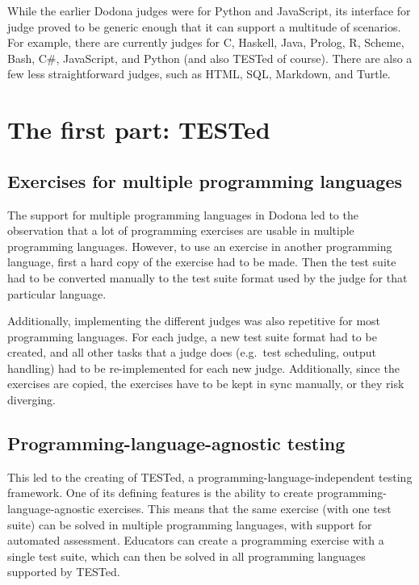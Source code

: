 \documentclass[./main]{subfiles}
\begin{document}
While the earlier Dodona judges were for Python and JavaScript, its interface for judge proved to be generic enough that it can support a multitude of scenarios.
For example, there are currently judges for C, Haskell, Java, Prolog, R, Scheme, Bash, C\#, JavaScript, and Python (and also TESTed of course).
There are also a few less straightforward judges, such as HTML, SQL, Markdown, and Turtle.

\section{The first part: TESTed}\label{sec:intro-tested}

\subsection{Exercises for multiple programming languages}\label{subsec:exercises-for-multiple-programming-languages}

The support for multiple programming languages in Dodona led to the observation that a lot of programming exercises are usable in multiple programming languages.
However, to use an exercise in another programming language, first a hard copy of the exercise had to be made.
Then the test suite had to be converted manually to the test suite format used by the judge for that particular language.

Additionally, implementing the different judges was also repetitive for most programming languages.
For each judge, a new test suite format had to be created, and all other tasks that a judge does (e.g.\ test scheduling, output handling) had to be re-implemented for each new judge.
Additionally, since the exercises are copied, the exercises have to be kept in sync manually, or they risk diverging.

\subsection{Programming-language-agnostic testing}\label{subsec:programming-language-agnostic-testing}

This led to the creating of TESTed, a programming-language-independent testing framework.
One of its defining features is the ability to create programming-language-agnostic exercises.
This means that the same exercise (with one test suite) can be solved in multiple programming languages, with support for automated assessment.
Educators can create a programming exercise with a single test suite, which can then be solved in all programming languages supported by TESTed.
\end{document}

